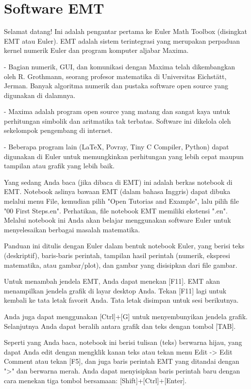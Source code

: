 \documentclass[12pt,arial,letterpaper]{book}
\begin{document}
\chapter{Software EMT}
\begin{eulernootebook}   
\begin{eulercomment}
Selamat datang! Ini adalah pengantar pertama ke Euler Math Toolbox
(disingkat EMT atau Euler). EMT adalah sistem terintegrasi yang
merupakan perpaduan kernel numerik Euler dan program komputer aljabar
Maxima.

- Bagian numerik, GUI, dan komunikasi dengan Maxima telah dikembangkan
oleh R. Grothmann, seorang profesor matematika di Universitas
Eichstätt, Jerman. Banyak algoritma numerik dan pustaka software open
source yang digunakan di dalamnya.

- Maxima adalah program open source yang matang dan sangat kaya untuk
perhitungan simbolik dan aritmatika tak terbatas. Software ini
dikelola oleh sekelompok pengembang di internet.

- Beberapa program lain (LaTeX, Povray, Tiny C Compiler, Python) dapat
digunakan di Euler untuk memungkinkan perhitungan yang lebih cepat
maupun tampilan atau grafik yang lebih baik.

Yang sedang Anda baca (jika dibaca di EMT) ini adalah berkas notebook
di EMT. Notebook aslinya bawaan EMT (dalam bahasa Inggris) dapat
dibuka melalui menu File, kemudian pilih "Open Tutorias and Example",
lalu pilih file "00 First Steps.en". Perhatikan, file notebook EMT
memiliki ekstensi ".en". Melalui notebook ini Anda akan belajar
menggunakan software Euler untuk menyelesaikan berbagai masalah
matematika.
\end{eulercomment}
\begin{eulercomment}
Panduan ini ditulis dengan Euler dalam bentuk notebook Euler, yang berisi teks
(deskriptif), baris-baris perintah, tampilan hasil perintah (numerik, ekspresi
matematika, atau gambar/plot), dan gambar yang disisipkan dari file gambar.

Untuk menambah jendela EMT, Anda dapat menekan [F11]. EMT akan menampilkan
jendela grafik di layar desktop Anda. Tekan [F11] lagi untuk kembali ke tata
letak favorit Anda. Tata letak disimpan untuk sesi berikutnya.

Anda juga dapat menggunakan [Ctrl]+[G] untuk menyembunyikan jendela grafik.
Selanjutnya Anda dapat beralih antara grafik dan teks dengan tombol [TAB].

Seperti yang Anda baca, notebook ini berisi tulisan (teks) berwarna hijau, yang
dapat Anda edit dengan mengklik kanan teks atau tekan menu Edit -\textgreater{} Edit Comment
atau tekan [F5], dan juga baris perintah EMT yang ditandai dengan "\textgreater{}" dan
berwarna merah. Anda dapat menyisipkan baris perintah baru dengan cara menekan
tiga tombol bersamaan: [Shift]+[Ctrl]+[Enter].


\end{eulercomment}
\end{eulernootebook}
\end{document}

